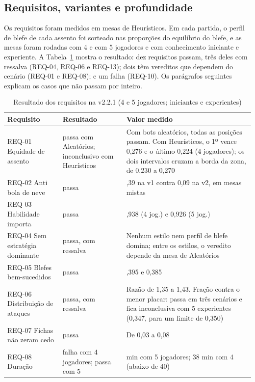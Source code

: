 \subsection{Requisitos, variantes e profundidade}
\label{sec:requisitos-resultados}

Os requisitos foram medidos em mesas de Heurísticos. Em cada partida, o perfil de blefe de cada assento foi
sorteado nas proporções do equilíbrio do blefe, e as mesas foram rodadas com 4 e com 5 jogadores e com
conhecimento iniciante e experiente. A Tabela~\ref{tab:resultados} mostra o resultado: dez requisitos passam,
três deles com ressalva (REQ-04, REQ-06 e REQ-13); dois têm vereditos que dependem do cenário (REQ-01 e
REQ-08); e um falha (REQ-10). Os parágrafos seguintes explicam os casos que não passam por inteiro.

\begin{table}[ht]
  \centering
  \caption{Resultado dos requisitos na v2.2.1 (4 e 5 jogadores; iniciantes e experientes)}
  \label{tab:resultados}
  \footnotesize
  \begin{tabularx}{\linewidth}{>{\raggedright\arraybackslash}p{3.2cm} >{\raggedright\arraybackslash}p{2.5cm} >{\raggedright\arraybackslash}X}
    \toprule
    Requisito & Resultado & Valor medido \\
    \midrule
    REQ-01 Equidade de assento & passa com Aleatórios; inconclusivo com Heurísticos & Com bots aleatórios, todas as posições passam. Com Heurísticos, o 1º vence 0,276 e o último 0,224 (4 jogadores); os dois intervalos cruzam a borda da zona, de 0,230 a 0,270 \\
    REQ-02 Anti bola de neve & passa & 0,39 na v1 contra 0,09 na v2, em mesas mistas \\
    REQ-03 Habilidade importa & passa & 0,938 (4 jog.) e 0,926 (5 jog.) \\
    REQ-04 Sem estratégia dominante & passa, com ressalva & Nenhum estilo nem perfil de blefe domina; entre os estilos, o veredito depende da mesa de Aleatórios \\
    REQ-05 Blefes bem-sucedidos & passa & 0,395 e 0,385 \\
    REQ-06 Distribuição de ataques & passa, com ressalva & Razão de 1,35 a 1,43. Fração contra o menor placar: passa em três cenários e fica inconclusiva com 5 experientes (0,347, para um limite de 0,350) \\
    REQ-07 Fichas não zeram cedo & passa & De 0,03 a 0,08 \\
    REQ-08 Duração & falha com 4 jogadores; passa com 5 & 44 min com 5 jogadores; 38 min com 4 (abaixo de 40) \\

\end{tabularx}
\end{table}
